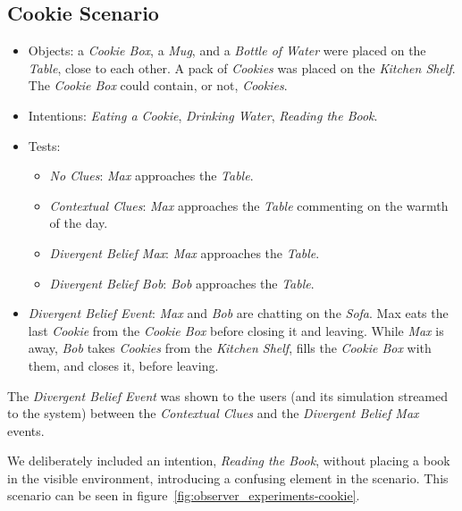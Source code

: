 \subsection{Cookie Scenario}
\begin{itemize}
\item Objects: a \textit{Cookie Box}, a \textit{Mug}, and a \textit{Bottle of Water} were placed on the \textit{Table}, close to each other. A pack of \textit{Cookies} was placed on the \textit{Kitchen Shelf}. The \textit{Cookie Box} could contain, or not, \textit{Cookies}.
\item Intentions: \textit{Eating a Cookie}, \textit{Drinking Water}, \textit{Reading the Book}.
\item Tests:
\begin{itemize}
	\item \textit{No Clues}: \textit{Max} approaches the \textit{Table}.
    \item \textit{Contextual Clues}: \textit{Max} approaches the \textit{Table} commenting on the warmth of the day.
	\item \textit{Divergent Belief Max}: \textit{Max} approaches the \textit{Table}.
	\item \textit{Divergent Belief Bob}: \textit{Bob} approaches the \textit{Table}.
\end{itemize}
\item  \textit{Divergent Belief Event}:  \textit{Max} and \textit{Bob} are chatting on the \textit{Sofa}. Max eats the last \textit{Cookie} from the \textit{Cookie Box} before closing it and leaving. While \textit{Max} is away, \textit{Bob} takes \textit{Cookies} from the \textit{Kitchen Shelf}, fills the \textit{Cookie Box} with them, and closes it, before leaving.
\end{itemize}

The \textit{Divergent Belief Event} was shown to the users (and its simulation streamed to the system) between the \textit{Contextual Clues} and the \textit{Divergent Belief Max} events. 


We deliberately included an intention, \textit{Reading the Book}, without placing a book in the visible environment, introducing a confusing element in the scenario. This scenario can be seen in figure~\ref{fig:observer_experiments-cookie}.



